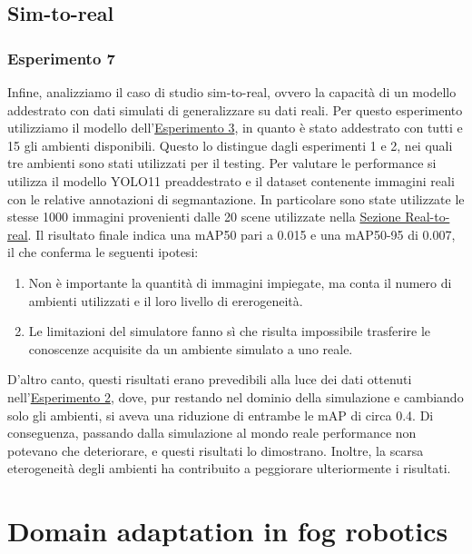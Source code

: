 \documentclass[12pt]{report}
\begin{document}
\subsection{Sim-to-real}
\label{sec:sim_to_real}

\subsubsection{Esperimento 7}
\label{sec:esperimento_7}

Infine, analizziamo il caso di studio sim-to-real, ovvero la capacità di un modello addestrato con dati simulati di generalizzare su dati reali. Per questo esperimento utilizziamo il modello dell'\hyperref[sec:esperimento_3]{Esperimento 3}, in quanto è stato addestrato con tutti e 15 gli ambienti disponibili. Questo lo distingue dagli esperimenti 1 e 2, nei quali tre ambienti sono stati utilizzati per il testing. Per valutare le performance si utilizza il modello YOLO11 preaddestrato e il dataset contenente immagini reali con le relative annotazioni di segmantazione. In particolare sono state utilizzate le stesse 1000 immagini provenienti dalle 20 scene utilizzate nella \hyperref[sec:real_to_real]{Sezione Real-to-real}. Il risultato finale indica una  mAP50 pari a 0.015 e una mAP50-95 di 0.007, il che conferma le seguenti ipotesi:

\begin{enumerate}
	\item Non è importante la quantità di immagini impiegate, ma conta il numero di ambienti utilizzati e il loro livello di ererogeneità.
	
	\item Le limitazioni del simulatore fanno sì che risulta impossibile trasferire le conoscenze acquisite da un ambiente simulato a uno reale. 
\end{enumerate}

D'altro canto, questi risultati erano prevedibili alla luce dei dati ottenuti nell'\hyperref[sec:esperimento_2]{Esperimento 2}, dove, pur restando nel dominio della simulazione e cambiando solo gli ambienti, si aveva una riduzione di entrambe le mAP di circa 0.4. Di conseguenza, passando dalla simulazione al mondo reale performance non potevano che deteriorare, e questi risultati lo dimostrano. Inoltre, la scarsa eterogeneità degli ambienti ha contribuito a peggiorare ulteriormente i risultati.

\section{Domain adaptation in fog robotics}
\label{sec:domain_shift_in_contesto_fog_robotics}
\end{document}

